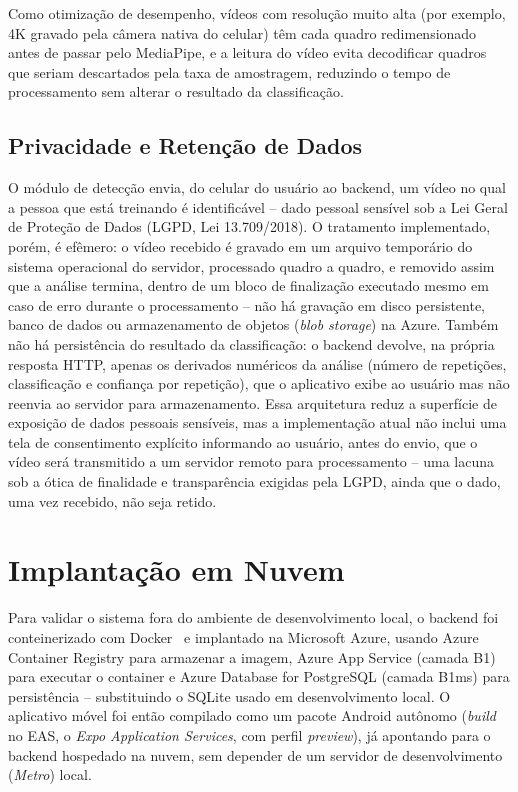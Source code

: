 \documentclass[12pt]{article}
\begin{document}
Como otimização de desempenho, vídeos com resolução muito alta (por
exemplo, 4K gravado pela câmera nativa do celular) têm cada quadro
redimensionado antes de passar pelo MediaPipe, e a leitura do vídeo evita
decodificar quadros que seriam descartados pela taxa de amostragem,
reduzindo o tempo de processamento sem alterar o resultado da
classificação.

\subsection{Privacidade e Retenção de Dados}

O módulo de detecção envia, do celular do usuário ao backend, um vídeo no
qual a pessoa que está treinando é identificável -- dado pessoal sensível
sob a Lei Geral de Proteção de Dados (LGPD, Lei 13.709/2018). O tratamento
implementado, porém, é efêmero: o vídeo recebido é gravado em um arquivo
temporário do sistema operacional do servidor, processado quadro a quadro,
e removido assim que a análise termina, dentro de um bloco de finalização
executado mesmo em caso de erro durante o processamento -- não há gravação
em disco persistente, banco de dados ou armazenamento de objetos
(\textit{blob storage}) na Azure. Também não há persistência do resultado
da classificação: o backend devolve, na própria resposta HTTP, apenas os
derivados numéricos da análise (número de repetições, classificação e
confiança por repetição), que o aplicativo exibe ao usuário mas não
reenvia ao servidor para armazenamento. Essa arquitetura reduz a
superfície de exposição de dados pessoais sensíveis, mas a implementação
atual não inclui uma tela de consentimento explícito informando ao
usuário, antes do envio, que o vídeo será transmitido a um servidor remoto
para processamento -- uma lacuna sob a ótica de finalidade e transparência
exigidas pela LGPD, ainda que o dado, uma vez recebido, não seja retido.

\section{Implantação em Nuvem}

Para validar o sistema fora do ambiente de desenvolvimento local, o
backend foi conteinerizado com Docker~\cite{docker} e implantado na
Microsoft Azure, usando Azure Container Registry para armazenar a imagem,
Azure App Service (camada B1) para executar o container e Azure Database
for PostgreSQL (camada B1ms) para persistência -- substituindo o SQLite
usado em desenvolvimento local. O aplicativo móvel foi então compilado
como um pacote Android autônomo (\textit{build} no EAS, o \textit{Expo Application Services}, com perfil
\textit{preview}), já apontando para o backend hospedado na nuvem, sem
depender de um servidor de desenvolvimento (\textit{Metro}) local.
\end{document}
